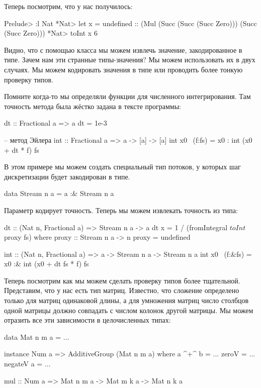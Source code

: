 Теперь посмотрим, что у нас получилось:

\begin{code}
Prelude> :l Nat
*Nat> let x = undefined :: (Mul (Succ (Succ (Succ Zero))) (Succ (Succ Zero)))
*Nat> toInt x
6
\end{code}

Видно, что с помощью класса  мы можем извлечь значение,
закодированное в типе. Зачем нам эти странные типы-значения? 
Мы можем использовать их в двух случаях. Мы можем кодировать
значения в типе или проводить более тонкую проверку типов.

Помните когда-то мы определяли функции для численного 
интегрирования. Там точность метода была жёстко задана
в тексте программы:


\begin{code}

dt :: Fractional a => a
dt = 1e-3

-- метод Эйлера
int :: Fractional a => a -> [a] -> [a]
int x0 ~(f:fs) = x0 : int (x0 + dt * f) fs
\end{code}

В этом примере мы можем создать специальный тип
потоков, у которых шаг дискретизации будет закодирован
в типе. 

\begin{code}
data Stream n a = a :& Stream n a
\end{code}

Параметр  кодирует точность. Теперь мы можем
извлекать точность из типа:

\begin{code}
dt :: (Nat n, Fractional a) => Stream n a -> a
dt x = 1 / (fromIntegral $ toInt $ proxy fs)
    where proxy :: Stream n a -> n
          proxy = undefined

int :: (Nat n, Fractional a) => a -> Stream n a -> Stream n a
int x0 ~(f:&fs) = x0 :& int (x0 + dt fs * f) fs
\end{code}

Теперь посмотрим как мы можем сделать проверку типов более
тщательной. Представим, что у нас есть тип матриц. 
Известно, что сложение определено только для матриц
одинаковой длины, а для умножения матриц число столбцов одной матрицы
должно совпадать с числом колонок другой матрицы. Мы можем отразить
все эти зависимости в целочисленных типах:


\begin{code}
data Mat n m a = ...

instance Num a => AdditiveGroup (Mat n m a) where
    a ^+^ b     = ...
    zeroV       = ...
    negateV a   = ...

mul :: Num a => Mat n m a -> Mat m k a -> Mat n k a
\end{code}

